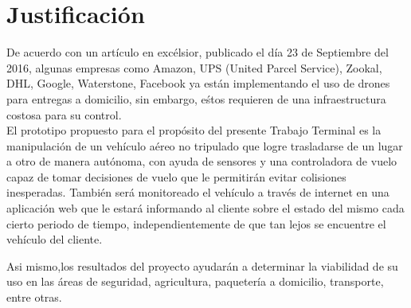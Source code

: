 %

\section{Justificación}

De acuerdo con un artículo en  excélsior, publicado el día 23 de Septiembre del 2016, algunas empresas como Amazon, UPS (United Parcel Service), Zookal, DHL, Google, Waterstone, Facebook  ya están implementando el uso de drones para entregas a domicilio, sin embargo, eśtos requieren de una infraestructura costosa para su control. \\
El prototipo propuesto para el propósito del presente Trabajo Terminal es la manipulación de un vehículo aéreo no tripulado que logre trasladarse de un lugar a otro de manera autónoma, con ayuda de sensores y una controladora de vuelo capaz de tomar decisiones de vuelo que le permitirán evitar colisiones inesperadas.
También será monitoreado el vehículo a través de internet en una aplicación web que le estará informando al cliente sobre el estado del mismo cada cierto periodo de tiempo, independientemente de que tan lejos se encuentre el vehículo del cliente.

Asi mismo,los resultados del proyecto ayudarán a determinar la viabilidad de su uso en las áreas de seguridad, agricultura, paquetería a domicilio, transporte, entre otras. \\
